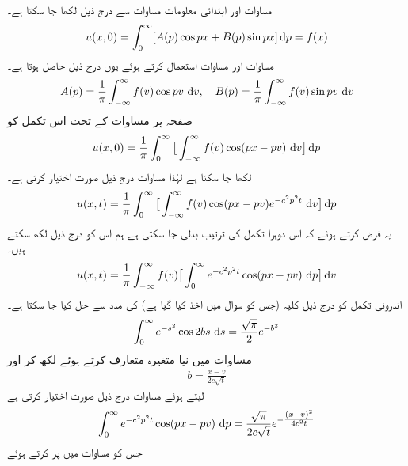 مساوات  اور ابتدائی معلومات مساوات  سے درج ذیل لکھا جا سکتا ہے۔
\begin{align}\label{مساوات_جزوی_حراری_لامتناہی_ج}
u(x,0)=\int_0^{\infty}[A(p)\cos px+B(p)\sin px]\dif p=f(x)
\end{align}
مساوات  اور مساوات  استعمال کرتے ہوئے یوں درج ذیل حاصل ہوتا ہے۔
\begin{align}\label{مساوات_جزوی_حراری_لامتناہی_چ}
A(p)=\frac{1}{\pi}\int_{-\infty}^{\infty} f(v)\cos pv\,\dif v,\quad B(p)=\frac{1}{\pi}\int_{-\infty}^{\infty} f(v)\sin pv\,\dif v
\end{align}
صفحہ  پر مساوات  کے تحت اس تکمل کو
\begin{align*}
u(x,0)=\frac{1}{\pi}\int_{0}^{\infty} \big[\int_{-\infty}^{\infty} f(v)\cos(px-pv)\,\dif v\big]\dif p
\end{align*}
لکھا جا سکتا ہے لہٰذا مساوات  درج ذیل صورت اختیار کرتی ہے۔
\begin{align*}
u(x,t)=\frac{1}{\pi}\int_0^{\infty}\big[\int_{-\infty}^{\infty}f(v)\cos (px-pv)e^{-c^2p^2t}\,\dif v\big]\dif p
\end{align*}
یہ فرض کرتے ہوئے کہ اس دوہرا تکمل کی ترتیب بدلی جا سکتی ہے ہم اس کو درج ذیل لکھ سکتے ہیں۔
\begin{align}\label{مساوات_جزوی_حراری_لامتناہی_ح}
u(x,t)=\frac{1}{\pi}\int_{-\infty}^{\infty} f(v) \big[\int_0^{\infty}e^{-c^2p^2t}\cos(px-pv)\,\dif p\big]\dif v
\end{align}
اندرونی تکمل کو درج ذیل کلیہ (جس کو سوال  میں اخذ کیا گیا ہے) کی مدد سے حل کیا جا سکتا ہے۔
\begin{align}\label{مساوات_جزوی_حراری_لامتناہی_خ}
\int_0^{\infty}e^{-s^2}\cos 2bs\,\dif s=\frac{\sqrt{\pi}}{2}e^{-b^2}
\end{align}
مساوات  میں نیا متغیرہ  متعارف کرتے ہوئے  لکھ کر اور
\begin{align*}
b=\frac{x-v}{2c\sqrt{t}}
\end{align*}
لیتے ہوئے مساوات  درج ذیل صورت اختیار کرتی ہے
\begin{align*}
\int_0^{\infty}e^{-c^2p^2t}\cos (px-pv)\,\dif p=\frac{\sqrt{\pi}}{2c\sqrt{t}}e^{-\tfrac{(x-v)^2}{4c^2t}}
\end{align*}
جس کو مساوات  میں پر کرتے ہوئے 

